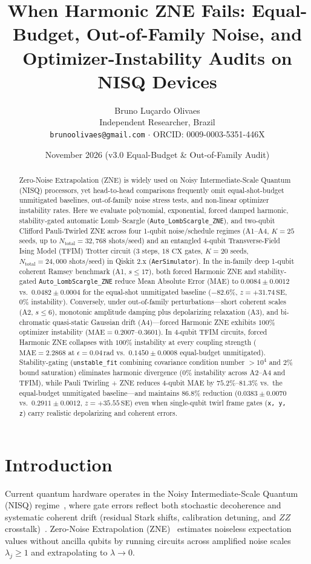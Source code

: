 \documentclass[10pt,twocolumn,a4paper]{article}
\title{\textbf{When Harmonic ZNE Fails: Equal-Budget, Out-of-Family Noise, and Optimizer-Instability Audits on NISQ Devices}}
\author{Bruno Lu\c{c}ardo Olivaes \\ \small Independent Researcher, Brazil \\ \small \texttt{brunoolivaes@gmail.com} $\cdot$ ORCID: 0009-0003-5351-446X}
\date{November 2026 (v3.0 Equal-Budget \& Out-of-Family Audit)}
\begin{document}
\maketitle

\begin{abstract}
\noindent Zero-Noise Extrapolation (ZNE) is widely used on Noisy Intermediate-Scale Quantum (NISQ) processors, yet head-to-head comparisons frequently omit equal-shot-budget unmitigated baselines, out-of-family noise stress tests, and non-linear optimizer instability rates. Here we evaluate polynomial, exponential, forced damped harmonic, stability-gated automatic Lomb--Scargle (\texttt{Auto\_LombScargle\_ZNE}), and two-qubit Clifford Pauli-Twirled ZNE across four 1-qubit noise/schedule regimes (A1--A4, $K=25$ seeds, up to $N_{\mathrm{total}} = 32{,}768$ shots/seed) and an entangled 4-qubit Transverse-Field Ising Model (TFIM) Trotter circuit ($3$ steps, $18$ $\mathrm{CX}$ gates, $K=20$ seeds, $N_{\mathrm{total}} = 24{,}000$ shots/seed) in Qiskit 2.x (\texttt{AerSimulator}). In the in-family deep 1-qubit coherent Ramsey benchmark (A1, $s \le 17$), both forced Harmonic ZNE and stability-gated \texttt{Auto\_LombScargle\_ZNE} reduce Mean Absolute Error (MAE) to $0.0084 \pm 0.0012$ vs.\ $0.0482 \pm 0.0004$ for the equal-shot unmitigated baseline ($-82.6\%$, $z = +31.74\,\mathrm{SE}$, $0\%$ instability). Conversely, under out-of-family perturbations—short coherent scales (A2, $s \le 6$), monotonic amplitude damping plus depolarizing relaxation (A3), and bi-chromatic quasi-static Gaussian drift (A4)—forced Harmonic ZNE exhibits $100\%$ optimizer instability ($\mathrm{MAE} = 0.2007\text{--}0.3601$). In 4-qubit TFIM circuits, forced Harmonic ZNE collapses with $100\%$ instability at every coupling strength ($\mathrm{MAE} = 2.2868$ at $\epsilon = 0.04\,$rad vs.\ $0.1450 \pm 0.0008$ equal-budget unmitigated). Stability-gating (\texttt{unstable\_fit} combining covariance condition number $> 10^4$ and $2\%$ bound saturation) eliminates harmonic divergence ($0\%$ instability across A2--A4 and TFIM), while Pauli Twirling + ZNE reduces 4-qubit MAE by $75.2\%\text{--}81.3\%$ vs.\ the equal-budget unmitigated baseline—and maintains $86.8\%$ reduction ($0.0383 \pm 0.0070$ vs.\ $0.2911 \pm 0.0012$, $z = +35.55\,\mathrm{SE}$) even when single-qubit twirl frame gates (\texttt{x, y, z}) carry realistic depolarizing and coherent errors.
\end{abstract}

\section{Introduction}
Current quantum hardware operates in the Noisy Intermediate-Scale Quantum (NISQ) regime~\cite{preskill2018}, where gate errors reflect both stochastic decoherence and systematic coherent drift (residual Stark shifts, calibration detuning, and $ZZ$ crosstalk)~\cite{kandala2019,hashim2021}. Zero-Noise Extrapolation (ZNE)~\cite{temme2017,li2017,giurgica2020} estimates noiseless expectation values without ancilla qubits by running circuits across amplified noise scales $\lambda_j \ge 1$ and extrapolating to $\lambda \to 0$.
\end{document}
